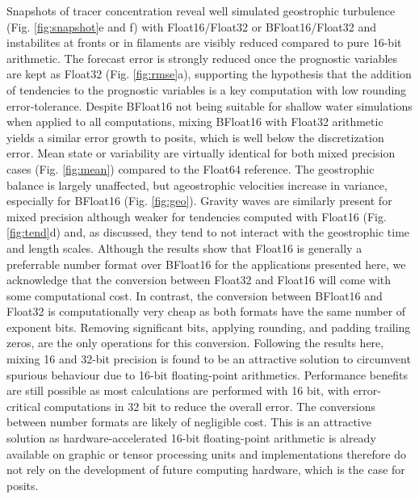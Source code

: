 \documentclass[draft]{agujournal2019}
\begin{document}
Snapshots of tracer concentration reveal well simulated geostrophic turbulence
(Fig. \ref{fig:snapshot}e and f) with Float16/Float32 or BFloat16/Float32 and
instabilites at fronts or in filaments are visibly reduced compared to pure
16-bit arithmetic. The forecast error is strongly reduced once the prognostic
variables are kept as Float32 (Fig. \ref{fig:rmse}a), supporting the hypothesis
that the addition of tendencies to the prognostic variables is a key computation
with low rounding error-tolerance. Despite BFloat16 not being suitable for shallow
water simulations when applied to all computations, mixing BFloat16 with Float32
arithmetic yields a similar error growth to posits, which is well below the
discretization error. Mean state or variability are virtually identical for both
mixed precision cases (Fig. \ref{fig:mean}) compared to the Float64 reference.
The geostrophic balance is largely unaffected, but ageostrophic velocities increase
in variance, especially for BFloat16 (Fig. \ref{fig:geo}). Gravity waves are
similarly present for mixed precision although weaker for tendencies computed
with Float16 (Fig. \ref{fig:tend}d) and, as discussed, they tend to not interact
with the geostrophic time and length scales. Although the results show that Float16
is generally a preferrable number format over BFloat16 for the applications presented
here, we acknowledge that the conversion between Float32 and Float16 will come
with some computational cost. In contrast, the conversion between BFloat16 and
Float32 is computationally very cheap as both formats have the same number of
exponent bits. Removing significant bits, applying rounding, and padding
trailing zeros, are the only operations for this conversion. Following the
results here, mixing 16 and 32-bit precision is found to be an attractive solution
to circumvent spurious behaviour due to 16-bit floating-point arithmetics.
Performance benefits are still possible as most calculations are performed with
16 bit, with error-critical computations in 32 bit to reduce the overall error.
The conversions between number formats are likely of negligible cost. This is an
attractive solution as hardware-accelerated 16-bit floating-point arithmetic is
already available on graphic or tensor processing units and implementations
therefore do not rely on the development of future computing hardware, which is
the case for posits.
\end{document}
